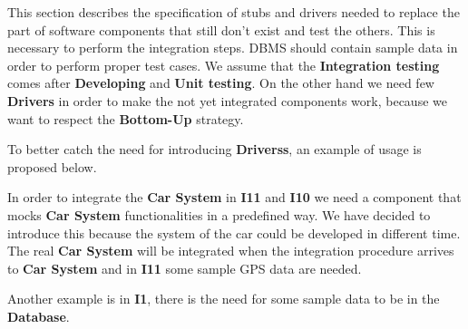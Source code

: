 This section describes the specification of stubs and drivers needed to replace the part of software components that still don't exist and test the others. This is necessary to perform the integration steps. DBMS should contain sample data in order to perform proper test cases. We assume that the \textbf{Integration testing} comes after \textbf{Developing} and \textbf{Unit testing}. %
On the other hand we need few \textbf{Drivers} in order to make the not yet integrated components work, because we want to respect the \textbf{Bottom-Up} strategy.\par
To better catch the need for introducing \textbf{Driverss}, an example of usage is proposed below.\par
In order to integrate the \textbf{Car System} in \textbf{I11} and \textbf{I10}  we need a component that mocks \textbf{Car System} functionalities in a predefined way. We have decided to introduce this because the system of the car could be developed in different time. The real \textbf{Car System} will be integrated when the integration procedure arrives to \textbf{Car System} and in \textbf{I11} some sample GPS data are needed.\par
 Another example is in \textbf{I1}, there is the need for some sample data to be in the \textbf{Database}.
